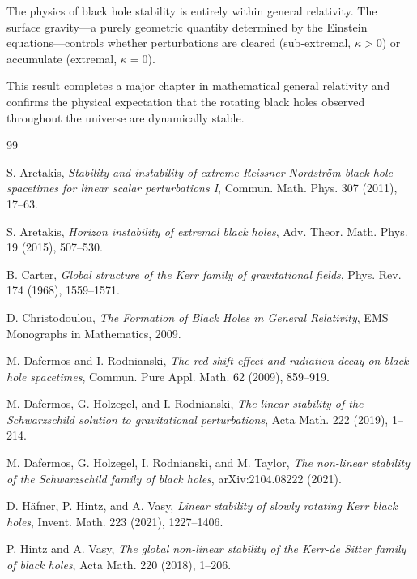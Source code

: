 \documentclass[12pt,a4paper]{article}
\begin{document}
The physics of black hole stability is entirely within general relativity. The surface gravity—a purely geometric quantity determined by the Einstein equations—controls whether perturbations are cleared (sub-extremal, $\kappa > 0$) or accumulate (extremal, $\kappa = 0$).

This result completes a major chapter in mathematical general relativity and confirms the physical expectation that the rotating black holes observed throughout the universe are dynamically stable.


\begin{thebibliography}{99}

S. Aretakis, \textit{Stability and instability of extreme Reissner-Nordström black hole spacetimes for linear scalar perturbations I}, Commun. Math. Phys. 307 (2011), 17--63.

S. Aretakis, \textit{Horizon instability of extremal black holes}, Adv. Theor. Math. Phys. 19 (2015), 507--530.

B. Carter, \textit{Global structure of the Kerr family of gravitational fields}, Phys. Rev. 174 (1968), 1559--1571.

D. Christodoulou, \textit{The Formation of Black Holes in General Relativity}, EMS Monographs in Mathematics, 2009.

M. Dafermos and I. Rodnianski, \textit{The red-shift effect and radiation decay on black hole spacetimes}, Commun. Pure Appl. Math. 62 (2009), 859--919.

M. Dafermos, G. Holzegel, and I. Rodnianski, \textit{The linear stability of the Schwarzschild solution to gravitational perturbations}, Acta Math. 222 (2019), 1--214.

M. Dafermos, G. Holzegel, I. Rodnianski, and M. Taylor, \textit{The non-linear stability of the Schwarzschild family of black holes}, arXiv:2104.08222 (2021).

D. Häfner, P. Hintz, and A. Vasy, \textit{Linear stability of slowly rotating Kerr black holes}, Invent. Math. 223 (2021), 1227--1406.

P. Hintz and A. Vasy, \textit{The global non-linear stability of the Kerr-de Sitter family of black holes}, Acta Math. 220 (2018), 1--206.


\end{thebibliography}
\end{document}
